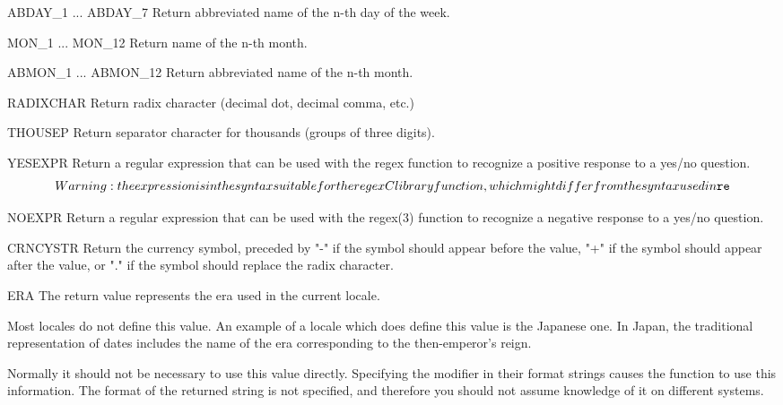 \begin{datadesc}{ABDAY_1 ... ABDAY_7}
Return abbreviated name of the n-th day of the week.
\end{datadesc}

\begin{datadesc}{MON_1 ... MON_12}
Return name of the n-th month.
\end{datadesc}

\begin{datadesc}{ABMON_1 ... ABMON_12}
Return abbreviated name of the n-th month.
\end{datadesc}

\begin{datadesc}{RADIXCHAR}
Return radix character (decimal dot, decimal comma, etc.)
\end{datadesc}

\begin{datadesc}{THOUSEP}
Return separator character for thousands (groups of three digits).
\end{datadesc}

\begin{datadesc}{YESEXPR}
Return a regular expression that can be used with the regex
function to recognize a positive response to a yes/no question.
\[Warning: the expression is in the syntax suitable for the
  regex C library function, which might differ from the syntax
  used in \module{re}\]
\end{datadesc}

\begin{datadesc}{NOEXPR}
Return a regular expression that can be used with the regex(3)
function to recognize a negative response to a yes/no question.
\end{datadesc}

\begin{datadesc}{CRNCYSTR}
Return the currency symbol, preceded by "-" if the symbol should
appear before the value, "+" if the symbol should appear after the
value, or "." if the symbol should replace the radix character.
\end{datadesc}

\begin{datadesc}{ERA}
The return value represents the era used in the current locale.

Most locales do not define this value.  An example of a locale which
does define this value is the Japanese one.  In Japan, the traditional
representation of dates includes the name of the era corresponding to
the then-emperor's reign.

Normally it should not be necessary to use this value directly.
Specifying the  modifier in their format strings causes the
 function to use this information.  The format of the
returned string is not specified, and therefore you should not assume
knowledge of it on different systems.
\end{datadesc}

